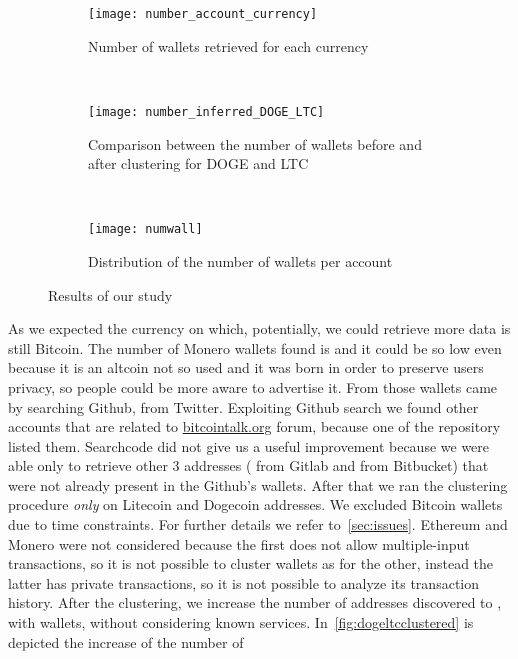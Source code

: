 \begin{figure*}
\centering
\begin{subfigure}[t]{0.3\textwidth}
\centering
\texttt{[image: number\_account\_currency]}
\caption{Number of wallets retrieved for each currency}
\label{fig:numberaccountcurrency}
\end{subfigure}
~
\begin{subfigure}[t]{0.3\textwidth}
\texttt{[image: number\_inferred\_DOGE\_LTC]}
\caption{Comparison between the number of wallets before and after clustering
for DOGE and LTC}
\label{fig:dogeltcclustered}
\end{subfigure}
~
\begin{subfigure}[t]{0.3\textwidth}
\centering
\texttt{[image: numwall]}
\caption{Distribution of the number of wallets per account}
\label{fig:numwall}
\end{subfigure}
\caption{Results of our study}
\end{figure*}
As we expected the currency on which, potentially, we could retrieve more data
is still Bitcoin. The number of Monero wallets found is \startingXMR{} and it
could be so low even because it is an altcoin not so used and it was born in
order to preserve users privacy, so people could be more aware to advertise it.
From those wallets \accountGithub{} came by searching Github, \accountTwitter{}
from Twitter. Exploiting Github search we found other \accountBitcointalk{}
accounts that are related to \url{bitcointalk.org} forum, because one of the
repository listed them. Searchcode did not give us a useful improvement
because we were able only to retrieve other 3 addresses (\accountGitlab{} from
Gitlab and \accountBitbucket{} from Bitbucket) that were not already present in
the Github's wallets.
After that we ran the clustering procedure \emph{only} on Litecoin and Dogecoin
addresses. We excluded Bitcoin wallets due to time constraints.
For further details we
refer to~\autoref{sec:issues}. Ethereum and Monero were not considered
because the first does not allow multiple-input transactions, so it is not
possible to cluster wallets as for the other, instead the latter has private
transactions, so it is not possible to analyze its transaction history.
After the clustering, we increase the number of addresses discovered to
\clusteringNumberAllWallets{}, with \clusteringNumberWalletsNotService{}
wallets, without considering known services.
In~\autoref{fig:dogeltcclustered} is depicted the increase of the number of
